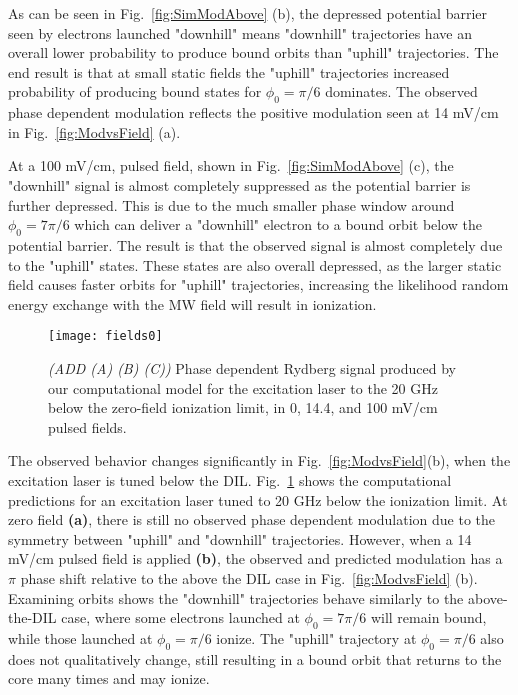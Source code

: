\documentclass[aps,pra,preprint,groupedaddress]{revtex4-1}
\begin{document}
As can be seen in Fig.~\ref{fig:SimModAbove} (b), the depressed potential barrier seen by electrons launched "downhill" means "downhill" trajectories have an overall lower probability to produce bound orbits than "uphill" trajectories. The end result is that at small static fields the "uphill" trajectories increased probability of producing bound states for $\phi_0 = \pi/6$ dominates. The observed phase dependent modulation reflects the positive modulation seen at 14 mV/cm in Fig.~\ref{fig:ModvsField} (a).

At a 100 mV/cm, pulsed field, shown in Fig.~\ref{fig:SimModAbove} (c), the "downhill" signal is almost completely suppressed as the potential barrier is further depressed. This is due to the much smaller phase window around $\phi_0 = 7\pi/6$ which can deliver a "downhill" electron to a bound orbit below the potential barrier. The result is that the observed signal is almost completely due to the "uphill" states. These states are also overall depressed, as the larger static field causes faster orbits for "uphill" trajectories, increasing the likelihood random energy exchange with the MW field will result in ionization.

\begin{figure}
	\texttt{[image: fields0]}
	\caption{\emph{(ADD (A) (B) (C))} Phase dependent Rydberg signal produced by our computational model for the excitation laser to the 20 GHz below the zero-field ionization limit, in 0, 14.4, and 100 mV/cm pulsed fields.}
	\label{fig:SimModBelow}
\end{figure}

The observed behavior changes significantly in Fig.~\ref{fig:ModvsField}(b), when the excitation laser is tuned below the DIL. Fig.~\ref{fig:SimModBelow} shows the computational predictions for an excitation laser tuned to 20 GHz below the ionization limit. At zero field \textbf{(a)}, there is still no observed phase dependent modulation due to the symmetry between "uphill" and "downhill" trajectories. However, when a 14 mV/cm pulsed field is applied \textbf{(b)}, the observed and predicted modulation has a $\pi$ phase shift relative to the above the DIL case in Fig.~\ref{fig:ModvsField} (b). Examining orbits shows the "downhill" trajectories behave similarly to the above-the-DIL case, where some electrons launched at $\phi_0 = 7\pi/6$ will remain bound, while those launched at $\phi_0 = \pi/6$ ionize. The "uphill" trajectory at $\phi_0 = \pi/6$ also does not qualitatively change, still resulting in a bound orbit that returns to the core many times and may ionize.
\end{document}
